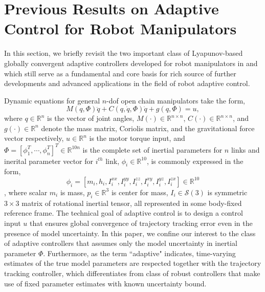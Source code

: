 \documentclass[letterpaper, 10 pt, conference]{ieeeconf}  %
\begin{document}
\section{Previous Results on Adaptive Control for Robot Manipulators} \label{section2}

In this section, we briefly revisit the two important class of Lyapunov-based globally convergent adaptive controllers developed for robot manipulators in \cite{Craig_AdaptiveControl} and \cite{Slotine_AdaptiveControl} which still serve as a fundamental and core basis for rich source of further developments and advanced applications in the field of robot adaptive control.

Dynamic equations for general $n$-dof open chain manipulators take the form,
\begin{equation}
M(q,\Phi)\ddot{q}+C(q,\dot{q},\Phi)\dot{q} + g(q,\Phi) = u, \label{dynamics}
\end{equation}
where $q\in\mathbb{R}^n$ is the vector of joint angles, $M(\cdot)\in\mathbb{R}^{n\times n}$, $C(\cdot)\in\mathbb{R}^{n\times n}$, and $g(\cdot)\in\mathbb{R}^{n}$ denote the mass matrix, Coriolis matrix, and the gravitational force vector respectively, $u\in\mathbb{R}^{n}$ is the motor torque input, and $\Phi = [\phi_{1}^{T}, \cdots, \phi_{n}^{T}]^{T}\in\mathbb{R}^{10n}$ is the complete set of inertial parameters for $n$ links and inerital parameter vector for $i^{th}$ link, $\phi_i\in\mathbb{R}^{10}$, is commonly expressed in the form,
\begin{equation*}
\phi_{i} = [m_i,h_i,I_i^{xx},I_i^{yy},I_i^{zz},I_i^{xy},I_i^{yz},I_i^{zx}]\in\mathbb{R}^{10}
\end{equation*}
, where scalar $m_i$ is mass, $p_i\in\mathbb{R}^3$ is center for mass, $I_i\in\mathcal{S}(3)$ is symmetric $3\times 3$ matrix of rotational inertial tensor, all represented in some body-fixed reference frame.
The technical goal of adaptive control is to design a control input $u$ that ensures global convergence of trajectory tracking error even in the presence of model uncertainty. In this paper, we confine our interest to the class of adaptive controllers that assumes only the model uncertainty in inertial parameter $\Phi$. Furthermore, as the term ``adaptive"  indicates, time-varying estimates of the true model parameters are respected together with the trajectory tracking controller, which differentiates from class of robust controllers that make use of fixed parameter estimates with known uncertainty bound.

\end{document}
